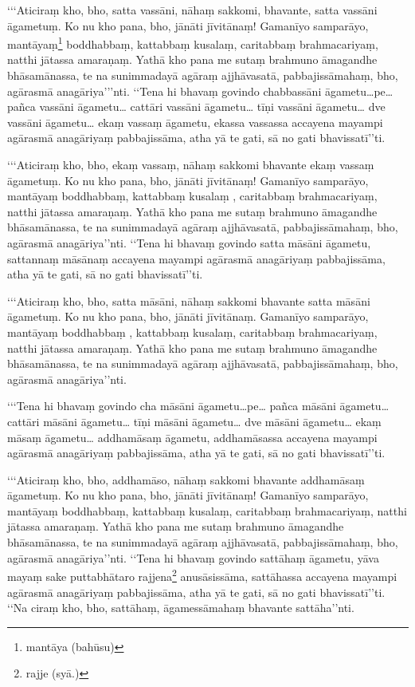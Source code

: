 ‘‘‘Aticiraṃ kho, bho, satta vassāni, nāhaṃ sakkomi, bhavante, satta vassāni āgametuṃ. Ko nu kho pana, bho, jānāti jīvitānaṃ! Gamanīyo samparāyo, mantāyaṃ\footnote{mantāya (bahūsu)} boddhabbaṃ, kattabbaṃ kusalaṃ, caritabbaṃ brahmacariyaṃ, natthi jātassa amaraṇaṃ. Yathā kho pana me sutaṃ brahmuno āmagandhe bhāsamānassa, te na sunimmadayā agāraṃ ajjhāvasatā, pabbajissāmahaṃ, bho, agārasmā anagāriya’’’nti. ‘‘Tena hi bhavaṃ govindo chabbassāni āgametu…pe… pañca vassāni āgametu… cattāri vassāni āgametu… tīṇi vassāni āgametu… dve vassāni āgametu… ekaṃ vassaṃ āgametu, ekassa vassassa accayena mayampi agārasmā anagāriyaṃ pabbajissāma, atha yā te gati, sā no gati bhavissatī’’ti.

‘‘‘Aticiraṃ kho, bho, ekaṃ vassaṃ, nāhaṃ sakkomi bhavante ekaṃ vassaṃ āgametuṃ. Ko nu kho pana, bho, jānāti jīvitānaṃ! Gamanīyo samparāyo, mantāyaṃ boddhabbaṃ, kattabbaṃ kusalaṃ , caritabbaṃ brahmacariyaṃ, natthi jātassa amaraṇaṃ. Yathā kho pana me sutaṃ brahmuno āmagandhe bhāsamānassa, te na sunimmadayā agāraṃ ajjhāvasatā, pabbajissāmahaṃ, bho, agārasmā anagāriya’’nti. ‘‘Tena hi bhavaṃ govindo satta māsāni āgametu, sattannaṃ māsānaṃ accayena mayampi agārasmā anagāriyaṃ pabbajissāma, atha yā te gati, sā no gati bhavissatī’’ti.

‘‘‘Aticiraṃ kho, bho, satta māsāni, nāhaṃ sakkomi bhavante satta māsāni āgametuṃ. Ko nu kho pana, bho, jānāti jīvitānaṃ. Gamanīyo samparāyo, mantāyaṃ boddhabbaṃ , kattabbaṃ kusalaṃ, caritabbaṃ brahmacariyaṃ, natthi jātassa amaraṇaṃ. Yathā kho pana me sutaṃ brahmuno āmagandhe bhāsamānassa, te na sunimmadayā agāraṃ ajjhāvasatā, pabbajissāmahaṃ, bho, agārasmā anagāriya’’nti.

‘‘‘Tena hi bhavaṃ govindo cha māsāni āgametu…pe… pañca māsāni āgametu… cattāri māsāni āgametu… tīṇi māsāni āgametu… dve māsāni āgametu… ekaṃ māsaṃ āgametu… addhamāsaṃ āgametu, addhamāsassa accayena mayampi agārasmā anagāriyaṃ pabbajissāma, atha yā te gati, sā no gati bhavissatī’’ti.

‘‘‘Aticiraṃ kho, bho, addhamāso, nāhaṃ sakkomi bhavante addhamāsaṃ āgametuṃ. Ko nu kho pana, bho, jānāti jīvitānaṃ! Gamanīyo samparāyo, mantāyaṃ boddhabbaṃ, kattabbaṃ kusalaṃ, caritabbaṃ brahmacariyaṃ, natthi jātassa amaraṇaṃ. Yathā kho pana me sutaṃ brahmuno āmagandhe bhāsamānassa, te na sunimmadayā agāraṃ ajjhāvasatā, pabbajissāmahaṃ, bho, agārasmā anagāriya’’nti. ‘‘Tena hi bhavaṃ govindo sattāhaṃ āgametu, yāva mayaṃ sake puttabhātaro rajjena\footnote{rajje (syā.)} anusāsissāma, sattāhassa accayena mayampi agārasmā anagāriyaṃ pabbajissāma, atha yā te gati, sā no gati bhavissatī’’ti. ‘‘Na ciraṃ kho, bho, sattāhaṃ, āgamessāmahaṃ bhavante sattāha’’nti.

